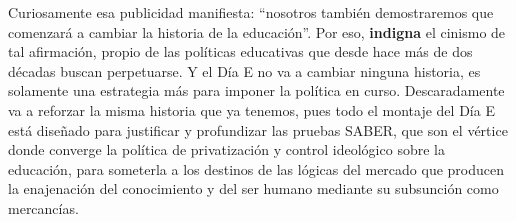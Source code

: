 \documentclass[10pt]{article}
\begin{document}
Curiosamente esa publicidad manifiesta: “nosotros también demostraremos que comenzará a cambiar la historia de la educación”. Por eso, \textbf{indigna} el cinismo de tal afirmación, propio de las políticas educativas que desde hace más de dos décadas buscan perpetuarse. Y el Día E no va a cambiar ninguna historia, es solamente una estrategia más para imponer la política en curso. Descaradamente va a reforzar la misma historia que ya tenemos, pues todo el montaje del Día E está diseñado para justificar y profundizar las pruebas SABER,
que son el vértice donde converge la política de privatización y control ideológico sobre la educación, para someterla a los destinos de las lógicas del mercado que producen la
enajenación del conocimiento y del ser humano mediante su subsunción como mercancías.
\end{document}
